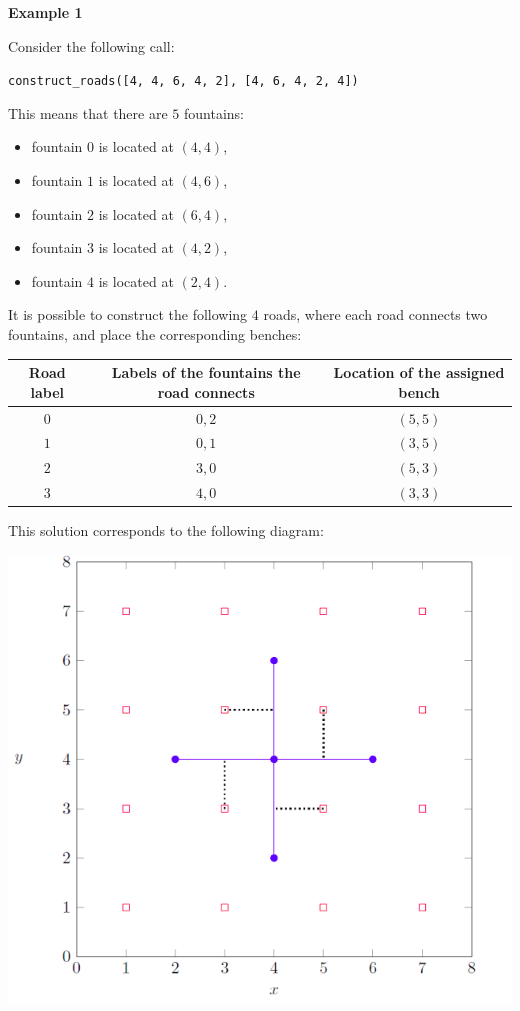 \textbf{Example 1}

Consider the following call:

\texttt{construct\_roads([4, 4, 6, 4, 2], [4, 6, 4, 2, 4])}

This means that there are $5$ fountains:
\begin{itemize}
\item fountain $0$ is located at $(4,4)$,
\item fountain $1$ is located at $(4,6)$,
\item fountain $2$ is located at $(6,4)$,
\item fountain $3$ is located at $(4,2)$,
\item fountain $4$ is located at $(2,4)$.
\end{itemize}

It is possible to construct the following $4$ roads, where each road connects two fountains, and place
the corresponding benches:

\begin{center}
\renewcommand{\arraystretch}{1.5}
\begin{tabular}{|c|c|c|}
\hline
Road label & Labels of the fountains the road connects & Location of the assigned bench \\
\hline
$0$&$0,2$&$(5,5)$\\
\hline
$1$&$0,1$& $(3,5)$\\
\hline
$2$&$3,0$& $(5,3)$\\
\hline
$3$&$4,0$& $(3,3)$\\
\hline
\end{tabular}
\end{center}

This solution corresponds to the following diagram:

\includegraphics[scale=0.7]{1.png}

